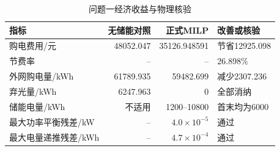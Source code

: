 \begin{table}[H]
\centering\small
\caption{问题一经济收益与物理核验}\label{tab:p1-summary}
\setlength{\tabcolsep}{4pt}
\begin{tabular}{lrrl}
\toprule
指标 & 无储能对照 & 正式MILP & 改善或核验 \\
\midrule
购电费用/元 & 48052.047 & 35126.948591 & 节省12925.098 \\
节费率 & -- & -- & 26.898\% \\
外网购电量/kWh & 61789.935 & 59482.699 & 减少2307.236 \\
弃光量/kWh & 6247.963 & 0 & 全部消纳 \\
储能电量/kWh & 不适用 & 1200--10800 & 首末均为6000 \\
最大功率平衡残差/kW & -- & $4.0\times10^{-5}$ & 通过 \\
最大电量递推残差/kWh & -- & $4.7\times10^{-4}$ & 通过 \\
\bottomrule
\end{tabular}
\end{table}
